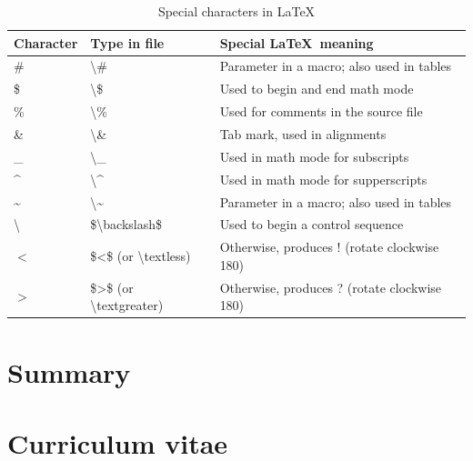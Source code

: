 \documentclass[a4paper,11pt,UTF8,openright]{book}
\begin{document}
\begin{center}
	\begin{table}[!htbp]
		\caption{Special characters in \LaTeX}
		\label{tab:special characters}
		\begin{tabular}{@{}lll@{}}
			\toprule
			\textbf{Character} & \textbf{Type in file} & \textbf{Special \LaTeX\ meaning}  \\ 
			\midrule
			\#	& \textbackslash\# & Parameter in a macro; also used in tables \\
			\$	& \textbackslash\$ & Used to begin and end math mode \\
			\%	& \textbackslash\% & Used for comments in the source file \\
			\&	& \textbackslash\& & Tab mark, used in alignments \\
			\_	& \textbackslash\_ & Used in math mode for subscripts \\
			\^{}	& \textbackslash\^{} & Used in math mode for supperscripts \\
			\~{}	& \textbackslash\~{} & Parameter in a macro; also used in tables \\
			\textbackslash	& \$\textbackslash backslash\$ & Used to begin a control sequence \\
			$<$	& \$<\$ (or \textbackslash textless) & Otherwise, produces ! (rotate clockwise 180\degree) \\
			$>$	& \$>\$ (or \textbackslash textgreater) & Otherwise, produces ? (rotate clockwise 180\degree) \\
			\bottomrule
		\end{tabular}
	\end{table}
\end{center}



\chapter{Summary}
\lipsum[1-3]

{}


\listoffigures

\listoftables

\chapter*{Curriculum vitae}
\end{document}
